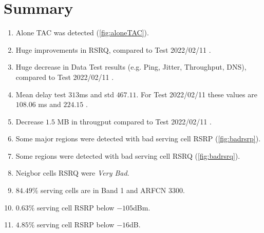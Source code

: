 \clearpage
\chapter{Summary}
\clearpage
\begin{enumerate}
	\item Alone TAC was detected \textcolor{Red}{\scalebox{1.8}{$\frownie$}} (\autoref{fig:aloneTAC}).
	\item Huge improvements in RSRQ, compared to Test 2022/02/11 \textcolor{Green}{\scalebox{1.8}{$\smiley$}}.
		\item Huge decrease in Data Test results (e.g. Ping, Jitter, Throughput, DNS), compared to Test 2022/02/11 \textcolor{Red}{\scalebox{1.8}{$\frownie$}}.
	\item Mean delay test $313$ms and std $467.11$. For Test 2022/02/11 these values are $108.06$ ms and $224.15$ \textcolor{Red}{\scalebox{1.8}{$\frownie$}}.
	\item Decrease $1.5$ MB in througput compared to Test 2022/02/11 \textcolor{Red}{\scalebox{1.8}{$\frownie$}}.
	\item Some major regions were detected with bad serving cell RSRP (\autoref{fig:badrsrp}).
	\item Some regions were detected with bad serving cell RSRQ (\autoref{fig:badrsrq}).
	\item Neigbor cells RSRQ were \textit{Very Bad}.
	\item $84.49\%$ serving cells are in Band 1 and ARFCN $3300$.
	\item $0.63\%$ serving cell RSRP below $-105$dBm.
		\item $4.85\%$ serving cell RSRP below $-16$dB.
\end{enumerate}